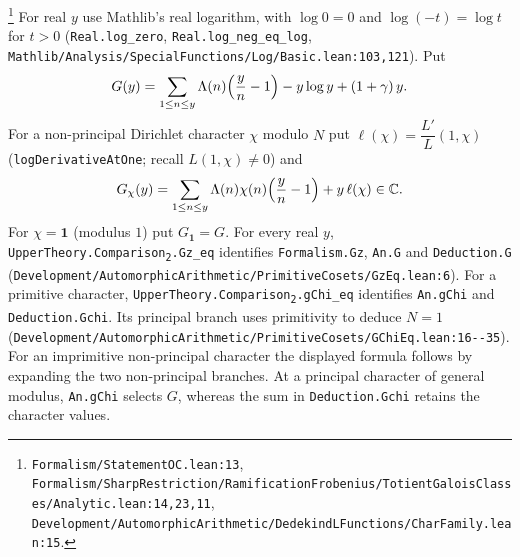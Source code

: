 \begin{definition}\label{def:E-G}
\footnote{\nolinkurl{Formalism/StatementOC.lean:13}, \nolinkurl{Formalism/SharpRestriction/RamificationFrobenius/TotientGaloisClasses/Analytic.lean:14,23,11}, \nolinkurl{Development/AutomorphicArithmetic/DedekindLFunctions/CharFamily.lean:15}.}%
For real $y$ use Mathlib's real logarithm, with $\log 0=0$ and $\log(-t)=\log t$ for $t>0$
(\texttt{Real.log\_zero}, \texttt{Real.log\_neg\_eq\_log},
\nolinkurl{Mathlib/Analysis/SpecialFunctions/Log/Basic.lean:103,121}). Put
\[
G(y)=\sum_{1\le n\le y}\Lambda(n)\Bigl(\frac yn-1\Bigr)-y\log y+(1+\gamma)\,y .
\]
For a non-principal Dirichlet character $\chi$ modulo $N$ put
$\ell(\chi)=\dfrac{L'}{L}(1,\chi)$ (\texttt{logDerivativeAtOne}; recall $L(1,\chi)\neq0$) and
\[
G_\chi(y)=\sum_{1\le n\le y}\Lambda(n)\chi(n)\Bigl(\frac yn-1\Bigr)+y\,\ell(\chi)\in\mathbb C .
\]
For $\chi=\mathbf 1$ (modulus $1$) put $G_{\mathbf 1}=G$. For every real $y$, \texttt{UpperTheory.Comparison\textsubscript{2}.Gz\_eq}
identifies \texttt{Formalism.Gz}, \texttt{An.G} and \texttt{Deduction.G}
(\nolinkurl{Development/AutomorphicArithmetic/PrimitiveCosets/GzEq.lean:6}).
For a primitive character, \texttt{UpperTheory.Comparison\textsubscript{2}.gChi\_eq} identifies
\texttt{An.gChi} and \texttt{Deduction.Gchi}. Its principal branch uses primitivity to deduce
$N=1$ (\nolinkurl{Development/AutomorphicArithmetic/PrimitiveCosets/GChiEq.lean:16--35}).
For an imprimitive non-principal character the displayed formula follows by expanding the two
non-principal branches. At a principal character of general modulus, \texttt{An.gChi} selects $G$,
whereas the sum in \texttt{Deduction.Gchi} retains the character values.
\end{definition}

